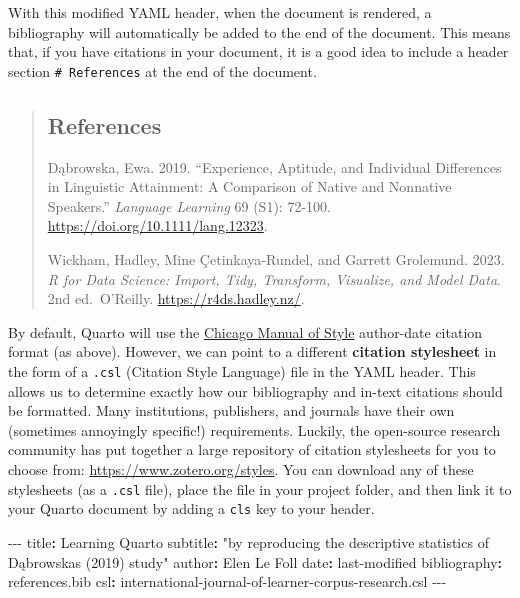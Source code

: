 \documentclass[
  letterpaper,
  DIV=11,
  numbers=noendperiod]{scrreprt}
\newenvironment{Shaded}{\begin{snugshade}}{\end{snugshade}}
\newcommand{\AttributeTok}[1]{\textcolor[rgb]{0.40,0.45,0.13}{#1}}
\newcommand{\FunctionTok}[1]{\textcolor[rgb]{0.28,0.35,0.67}{#1}}
\newcommand{\KeywordTok}[1]{\textcolor[rgb]{0.00,0.23,0.31}{\textbf{#1}}}
\newcommand{\PreprocessorTok}[1]{\textcolor[rgb]{0.68,0.00,0.00}{#1}}
\newcommand{\StringTok}[1]{\textcolor[rgb]{0.13,0.47,0.30}{#1}}
\begin{document}
With this modified YAML header, when the document is rendered, a
bibliography will automatically be added to the end of the document.
This means that, if you have citations in your document, it is a good
idea to include a header section \texttt{\#\ References} at the end of
the document.

\begin{quote}
\mbox{}%
\subsection*{References}\label{references}

Dąbrowska, Ewa. 2019. ``Experience, Aptitude, and Individual Differences
in Linguistic Attainment: A Comparison of Native and Nonnative
Speakers.'' \emph{Language Learning} 69 (S1): 72-100.
\url{https://doi.org/10.1111/lang.12323}.

Wickham, Hadley, Mine Çetinkaya-Rundel, and Garrett Grolemund. 2023.
\emph{R for Data Science: Import, Tidy, Transform, Visualize, and Model
Data}. 2nd ed.~O'Reilly. \url{https://r4ds.hadley.nz/}.
\end{quote}

By default, Quarto will use the
\href{https://chicagomanualofstyle.org/}{Chicago Manual of Style}
author-date citation format (as above). However, we can point to a
different \textbf{citation stylesheet} in the form of a \texttt{.csl}
(Citation Style Language) file in the YAML header. This allows us to
determine exactly how our bibliography and in-text citations should be
formatted. Many institutions, publishers, and journals have their own
(sometimes annoyingly specific!) requirements. Luckily, the open-source
research community has put together a large repository of citation
stylesheets for you to choose from: \url{https://www.zotero.org/styles}.
You can download any of these stylesheets (as a \texttt{.csl} file),
place the file in your project folder, and then link it to your Quarto
document by adding a \texttt{cls} key to your header.

\begin{Shaded}
\begin{Highlighting}[]
\PreprocessorTok{{-}{-}{-}}
\FunctionTok{title}\KeywordTok{:}\AttributeTok{ Learning Quarto}
\FunctionTok{subtitle}\KeywordTok{:}\AttributeTok{ }\StringTok{"by reproducing the descriptive statistics of Dąbrowska\textquotesingle{}s (2019) study"}
\FunctionTok{author}\KeywordTok{:}\AttributeTok{ Elen Le Foll}
\FunctionTok{date}\KeywordTok{:}\AttributeTok{ last{-}modified}
\FunctionTok{bibliography}\KeywordTok{:}\AttributeTok{ references.bib}
\FunctionTok{csl}\KeywordTok{:}\AttributeTok{ international{-}journal{-}of{-}learner{-}corpus{-}research.csl}
\PreprocessorTok{{-}{-}{-}}
\end{Highlighting}
\end{Shaded}
\end{document}
